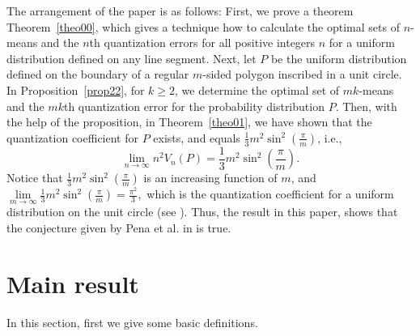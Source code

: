 \documentclass[12pt]{amsart}
\theoremstyle{plain}
\theoremstyle{definition}
\newcommand{\ga}{\alpha}
\begin{document}
The arrangement of the paper is as follows: First, we prove a theorem Theorem~\ref{theo00}, which gives a technique how to calculate the optimal sets of $n$-means and the $n$th quantization errors for all positive integers $n$ for a uniform distribution defined on any line segment. Next, let $P$ be the uniform distribution defined on the boundary of a regular $m$-sided polygon inscribed in a unit circle. In Proposition~\ref{prop22}, for $k\geq 2$, we determine the optimal set of $mk$-means and the $mk$th quantization error for the probability distribution $P$. Then, with the help of the proposition, in Theorem~\ref{theo01}, we have shown that the quantization coefficient for $P$ exists, and equals $\frac{1}{3} m^2 \sin ^2\left(\frac{\pi }{m}\right)$, i.e.,
\[\lim_{n\to \infty} n^2 V_n(P)=\frac{1}{3} m^2 \sin ^2\left(\frac{\pi }{m}\right).\]
Notice that $\frac{1}{3} m^2 \sin ^2\left(\frac{\pi }{m}\right)$ is an increasing function of $m$, and $\lim\limits_{m\to \infty} \frac{1}{3} m^2 \sin ^2\left(\frac{\pi }{m}\right)=\frac{\pi^2}{3},$
which is the quantization coefficient for a uniform distribution on the unit circle (see \cite{RR2}). Thus, the result in this paper, shows that the conjecture given by Pena et al. in \cite{PRRSS} is true.


\section{Main result}

In this section, first we give some basic definitions.

\end{document}
